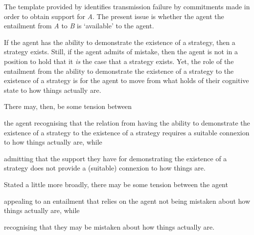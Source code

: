 \documentclass[10pt]{article}
\begin{document}
\begin{note}
  The template provided by \citeauthor{Wright:2011wn} identifies transmission failure by commitments made in order to obtain support for \emph{A}.
  The present issue is whether the agent the entailment from \emph{A} to \emph{B} is `available' to the agent.

  If the agent has the ability to demonstrate the existence of a strategy, then a strategy exists.
  Still, if the agent admits of mistake, then the agent is not in a position to hold that it \emph{is} the case that a strategy exists.
  Yet, the role of the entailment from the ability to demonstrate the existence of a strategy to the existence of a strategy is for the agent to move from what holds of their cognitive state to how things actually are.

  There may, then, be some tension between
  \begin{enumerate*}
  \item the agent recognising that the relation from having the ability to demonstrate the existence of a strategy to the existence of a strategy requires a suitable connexion to how things actually are, while
  \item admitting that the support they have for demonstrating the existence of a strategy does not provide a (suitable) connexion to how things are.
  \end{enumerate*}

  Stated a little more broadly, there may be some tension between the agent
  \begin{enumerate*}
  \item appealing to an entailment that relies on the agent not being mistaken about how things actually are, while
  \item recognising that they may be mistaken about how things actually are.
  \end{enumerate*}
\end{note}
\end{document}
